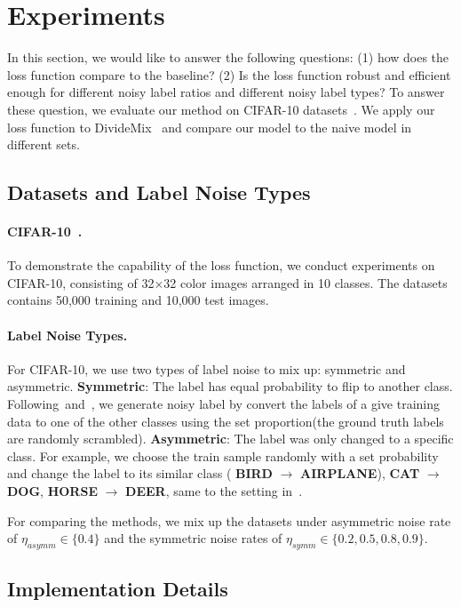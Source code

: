 \documentclass[10pt,twocolumn,letterpaper]{article}
\begin{document}
\section{Experiments}
In this section, we would like to answer the following questions: (1) how does the loss function compare to the baseline? (2) Is the loss function robust and efficient enough for different noisy label ratios and different noisy label types?
To answer these question, we evaluate our method on CIFAR-10 datasets~\cite{krizhevsky2009learning}. We apply our loss function to DivideMix~\cite{li2020dividemix} and compare our model to the naive model in different sets.

\subsection{Datasets and Label Noise Types}    
\paragraph{CIFAR-10~\cite{krizhevsky2009learning}.}To demonstrate the capability of the loss function, we conduct experiments on CIFAR-10, consisting of 32$\times$32 color images arranged in 10 classes. The datasets contains 50,000 training and 10,000 test images.
\paragraph{Label Noise Types.}For CIFAR-10, we use two types of label noise to mix up: symmetric and asymmetric. \textbf{Symmetric}: The label has equal probability to flip to another class. Following~\cite{he2016deep}and~\cite{tanaka2018joint}, we generate noisy label by convert the labels of a give training data to one of the other classes using the set proportion(the ground truth labels are randomly scrambled). \textbf{Asymmetric}: The label was only changed to a specific class. For example, we choose the train sample randomly with a set probability and change the label to its similar class ({\eg} \textbf{BIRD} $\rightarrow$ \textbf{AIRPLANE}), \textbf{CAT} $\rightarrow$ \textbf{DOG}, \textbf{HORSE} $\rightarrow$ \textbf{DEER}, same to the setting in~\cite{yao2019safeguarded}.

For comparing the methods, we mix up the datasets under asymmetric noise rate of $\eta_{a s y m m}\in\{0.4\}$ and the symmetric noise rates of $\eta_{s y m m}\in\{0.2,0.5,0.8,0.9\}$.
\subsection{Implementation Details}
\end{document}

